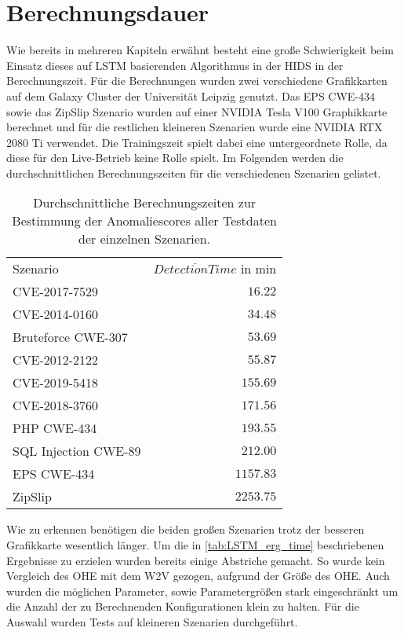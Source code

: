 \section{Berechnungsdauer}\label{sec:erg_time}
    Wie bereits in mehreren Kapiteln erwähnt besteht eine große Schwierigkeit beim Einsatz dieses auf \ac{LSTM} basierenden Algorithmus in der \ac{HIDS} in der Berechnungszeit.
    Für die Berechnungen wurden zwei verschiedene Grafikkarten auf dem Galaxy Cluster der Universität Leipzig genutzt.
    Das EPS CWE-$434$ sowie das ZipSlip Szenario wurden auf einer NVIDIA Tesla V100 Graphikkarte berechnet und für die restlichen kleineren Szenarien wurde eine NVIDIA RTX 2080 Ti verwendet.
    Die Trainingszeit spielt dabei eine untergeordnete Rolle, da diese für den Live-Betrieb keine Rolle spielt.
    Im Folgenden werden die durchschnittlichen Berechnungszeiten für die verschiedenen Szenarien gelistet.
    \begin{table}[ht]
        \centering
        \begin{tabular}{lr}
            \hline
            \rowcolor{GruvGray!36}
            \multicolumn{2}{c}{Berechnungszeiten der verschiedenen Szenarien}\\
            \toprule
            Szenario &  $\overline{Detection Time}$ in min\\
            \midrule
            \rowcolor{GruvGray!16}
            CVE-2017-7529 & $16.22$ \\
            CVE-2014-0160 & $34.48$ \\
            \rowcolor{GruvGray!16}
            Bruteforce CWE-307 & $53.69$ \\
            CVE-2012-2122 & $55.87$ \\
            \rowcolor{GruvGray!16}
            CVE-2019-5418 & $155.69$ \\
            CVE-2018-3760 & $171.56$ \\
            \rowcolor{GruvGray!16}
            PHP CWE-434 & $193.55$ \\
            SQL Injection CWE-89 & $212.00$ \\
            \rowcolor{GruvGray!16}
            EPS CWE-434 & $1157.83$ \\	
            ZipSlip & $2253.75$ \\	
            \hline
        \end{tabular}
        \caption{Durchschnittliche Berechnungszeiten zur Bestimmung der Anomaliescores aller Testdaten der einzelnen Szenarien.}
        \label{tab:LSTM_erg_time}
    \end{table}
    Wie zu erkennen benötigen die beiden großen Szenarien trotz der besseren Grafikkarte wesentlich länger.
    Um die in \autoref{tab:LSTM_erg_time} beschriebenen Ergebnisse zu erzielen wurden bereits einige Abstriche gemacht.
    So wurde kein Vergleich des \ac{OHE} mit dem \ac{W2V} gezogen, aufgrund der Größe des \ac{OHE}.
    Auch wurden die möglichen Parameter, sowie Parametergrößen stark eingeschränkt um die Anzahl der zu Berechnenden Konfigurationen klein zu halten.
    Für die Auswahl wurden Tests auf kleineren Szenarien durchgeführt.
    
